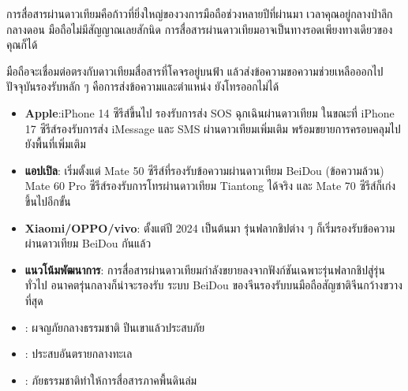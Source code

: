 


การสื่อสารผ่านดาวเทียมคือก้าวที่ยิ่งใหญ่ของวงการมือถือช่วงหลายปีที่ผ่านมา เวลาคุณอยู่กลางป่าลึกกลางดอน มือถือไม่มีสัญญาณเลยสักนิด การสื่อสารผ่านดาวเทียมอาจเป็นทางรอดเพียงทางเดียวของคุณก็ได้


มือถือจะเชื่อมต่อตรงกับดาวเทียมสื่อสารที่โคจรอยู่บนฟ้า แล้วส่งข้อความขอความช่วยเหลือออกไป ปัจจุบันรองรับหลัก ๆ คือการส่งข้อความและตำแหน่ง ยังโทรออกไม่ได้


\begin{itemize}
  \item \textbf{Apple}:iPhone 14 ซีรีส์ขึ้นไป รองรับการส่ง SOS ฉุกเฉินผ่านดาวเทียม ในขณะที่ iPhone 17 ซีรีส์รองรับการส่ง iMessage และ SMS ผ่านดาวเทียมเพิ่มเติม พร้อมขยายการครอบคลุมไปยังพื้นที่เพิ่มเติม
  \item \textbf{แอปเปิล}: เริ่มตั้งแต่ Mate 50 ซีรีส์ที่รองรับข้อความผ่านดาวเทียม BeiDou (ข้อความล้วน) Mate 60 Pro ซีรีส์รองรับการโทรผ่านดาวเทียม Tiantong ได้จริง และ Mate 70 ซีรีส์ก็เก่งขึ้นไปอีกขั้น
  \item \textbf{Xiaomi/OPPO/vivo}: ตั้งแต่ปี 2024 เป็นต้นมา รุ่นฟลากชิปต่าง ๆ ก็เริ่มรองรับข้อความผ่านดาวเทียม BeiDou กันแล้ว
  \item \textbf{แนวโน้มพัฒนาการ}: การสื่อสารผ่านดาวเทียมกำลังขยายลงจากฟังก์ชันเฉพาะรุ่นฟลากชิปสู่รุ่นทั่วไป อนาคตรุ่นกลางก็น่าจะรองรับ ระบบ BeiDou ของจีนรองรับบนมือถือสัญชาติจีนกว้างขวางที่สุด
\end{itemize}


\begin{itemize}
  \item : ผจญภัยกลางธรรมชาติ ปีนเขาแล้วประสบภัย
  \item : ประสบอันตรายกลางทะเล
  \item : ภัยธรรมชาติทำให้การสื่อสารภาคพื้นดินล่ม
\end{itemize}

